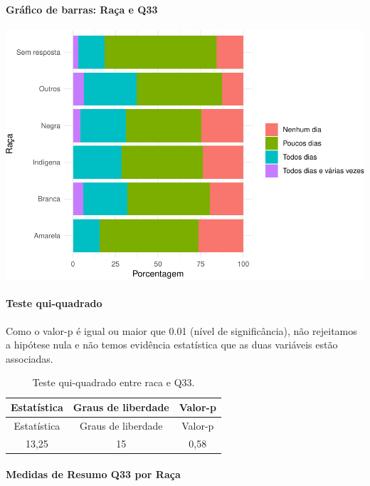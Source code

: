 \documentclass[]{article}
\let\oldparagraph\paragraph
\renewcommand{\paragraph}[1]{\oldparagraph{#1}\mbox{}}
\begin{document}
\hypertarget{gruxe1fico-de-barras-rauxe7a-e-q33}{%
\paragraph{Gráfico de barras: Raça e Q33}\label{gruxe1fico-de-barras-rauxe7a-e-q33}}

\begin{center}\includegraphics[width=0.75\linewidth]{relatorio_covid19_files/figure-latex/unnamed-chunk-1164-1} \end{center}

\hypertarget{teste-qui-quadrado-100}{%
\paragraph{Teste qui-quadrado}\label{teste-qui-quadrado-100}}

Como o valor-p é igual ou maior que 0.01 (nível de significância), não rejeitamos a hipótese nula e não temos evidência estatística que as duas variáveis estão associadas.

\begin{longtable}[]{@{}ccc@{}}
\caption{\label{tab:unnamed-chunk-1166}Teste qui-quadrado entre raca e Q33.}\tabularnewline
\toprule
Estatística & Graus de liberdade & Valor-p\tabularnewline
\midrule
\endfirsthead
\toprule
Estatística & Graus de liberdade & Valor-p\tabularnewline
\midrule
\endhead
13,25 & 15 & 0,58\tabularnewline
\bottomrule
\end{longtable}

\cleardoublepage

\hypertarget{medidas-de-resumo-q33-por-rauxe7a}{%
\paragraph{Medidas de Resumo Q33 por Raça}\label{medidas-de-resumo-q33-por-rauxe7a}}
\end{document}
